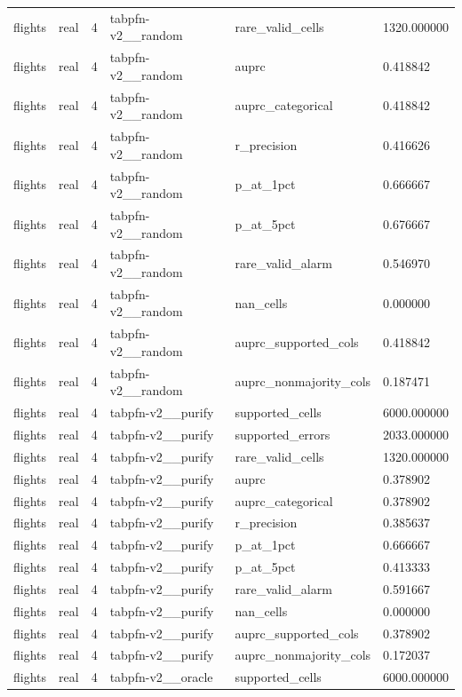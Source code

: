 \begin{tabular}{llllll}
flights & real & 4 & tabpfn-v2\_\_random & rare\_valid\_cells & 1320.000000 \\
flights & real & 4 & tabpfn-v2\_\_random & auprc & 0.418842 \\
flights & real & 4 & tabpfn-v2\_\_random & auprc\_categorical & 0.418842 \\
flights & real & 4 & tabpfn-v2\_\_random & r\_precision & 0.416626 \\
flights & real & 4 & tabpfn-v2\_\_random & p\_at\_1pct & 0.666667 \\
flights & real & 4 & tabpfn-v2\_\_random & p\_at\_5pct & 0.676667 \\
flights & real & 4 & tabpfn-v2\_\_random & rare\_valid\_alarm & 0.546970 \\
flights & real & 4 & tabpfn-v2\_\_random & nan\_cells & 0.000000 \\
flights & real & 4 & tabpfn-v2\_\_random & auprc\_supported\_cols & 0.418842 \\
flights & real & 4 & tabpfn-v2\_\_random & auprc\_nonmajority\_cols & 0.187471 \\
flights & real & 4 & tabpfn-v2\_\_purify & supported\_cells & 6000.000000 \\
flights & real & 4 & tabpfn-v2\_\_purify & supported\_errors & 2033.000000 \\
flights & real & 4 & tabpfn-v2\_\_purify & rare\_valid\_cells & 1320.000000 \\
flights & real & 4 & tabpfn-v2\_\_purify & auprc & 0.378902 \\
flights & real & 4 & tabpfn-v2\_\_purify & auprc\_categorical & 0.378902 \\
flights & real & 4 & tabpfn-v2\_\_purify & r\_precision & 0.385637 \\
flights & real & 4 & tabpfn-v2\_\_purify & p\_at\_1pct & 0.666667 \\
flights & real & 4 & tabpfn-v2\_\_purify & p\_at\_5pct & 0.413333 \\
flights & real & 4 & tabpfn-v2\_\_purify & rare\_valid\_alarm & 0.591667 \\
flights & real & 4 & tabpfn-v2\_\_purify & nan\_cells & 0.000000 \\
flights & real & 4 & tabpfn-v2\_\_purify & auprc\_supported\_cols & 0.378902 \\
flights & real & 4 & tabpfn-v2\_\_purify & auprc\_nonmajority\_cols & 0.172037 \\
flights & real & 4 & tabpfn-v2\_\_oracle & supported\_cells & 6000.000000 \\

\end{tabular}
